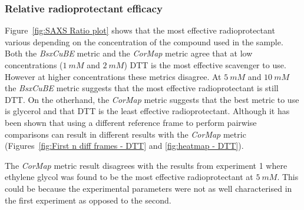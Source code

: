 \subsubsection{Relative radioprotectant efficacy}
\label{subs:Relative radioprotectant efficacy}
Figure~\ref{fig:SAXS Ratio plot} shows that the most effective radioprotectant various depending on the concentration of the compound used in the sample.
Both the \textit{BsxCuBE} metric and the \textit{CorMap} metric agree that at low concentrations ($1\ mM$ and $2\ mM$) DTT is the most effective scavenger to use.
However at higher concentrations these metrics disagree.
At $5\ mM$ and $10\ mM$ the \textit{BsxCuBE} metric suggests that the most effective radioprotectant is still DTT.
On the otherhand, the \textit{CorMap} metric suggests that the best metric to use is glycerol and that DTT is the least effective radioprotectant.
Although it has been shown that using a different reference frame to perform pairwise comparisons can result in different results with the \textit{CorMap} metric (Figures~\ref{fig:First n diff frames - DTT} and \ref{fig:heatmap - DTT}).

The \textit{CorMap} metric result disagrees with the results from experiment 1 where ethylene glycol was found to be the most effective radioprotectant at $5\ mM$. This could be because the experimental parameters were not as well characterised in the first experiment as opposed to the second.
